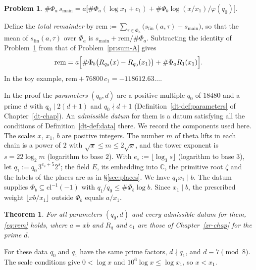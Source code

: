 \documentclass[reqno]{amsart}
\newcounter{chap}
\theoremstyle{definition}
\newtheorem{problem}{Problem}[section]
\theoremstyle{plain}
\newtheorem{theorem}{Theorem}[section]
\newcommand{\C}{\mathbb{C}}
\newcommand{\rem}{\mathrm{rem}}
\newcommand{\smain}{s_{\mathrm{main}}}
\begin{document}
\begin{problem}\label{pr:main}
\(\#\Phi_a\, \smain = a \bigl[ \#\Phi_a (\log x_1 + c_1) + \#\Phi_b \log(x/x_1)/\varphi(q_0) \bigr]\).
\end{problem}

Define the \emph{total remainder} by \(\rem := \sum_{\tau \in \Phi_a} \bigl( s_{\mathrm{fin}}(a, \tau) - \smain \bigr)\), so that the mean of \(s_{\mathrm{fin}}(a, \tau)\) over \(\Phi_a\) is \(\smain + \rem/\#\Phi_a\).  Subtracting the identity of Problem~\ref{pr:main} from that of Problem~\ref{pr:sum-A} gives
\begin{equation}\label{eq:rem}
  \rem = a \Bigl[ \#\Phi_b \bigl( R_{q_0}(x) - R_{q_0}(x_1) \bigr) + \#\Phi_a R_1(x_1) \Bigr] .
\end{equation}
In the toy example, \(\rem + 76800\, c_1 = -118612.63\ldots\).

In the proof the \emph{parameters} \((q_0, d)\) are a positive multiple \(q_0\) of \(18480\) and a prime \(d\) with \(q_0 \mid 2(d + 1)\) and \(q_0 \nmid d + 1\) (Definition~\ref{dt-def:parameters} of Chapter~\ref{dt-chap}).  An \emph{admissible datum} for them is a datum satisfying all the conditions of Definition~\ref{dt-def:data} there.  We record the components used here.  The scales \(x\), \(x_1\), \(b\) are positive integers.  The number \(m\) of theta lifts in each chain is a power of \(2\) with \(\sqrt x \le m \le 2\sqrt x\), and the tower exponent is \(s = 22 \log_2 m\) (logarithm to base \(2\)).  With \(e_s := \lfloor \log_3 s \rfloor\) (logarithm to base \(3\)), let \(q_1 := q_0\,3^{e_s+5}2^s\); the field \(E\), its embedding into \(\C\), the primitive root \(\zeta\) and the labels of the places are as in \S\ref{sec:places}.  We have \(q_1 x_1 \mid b\).  The datum supplies \(\Phi_b \subseteq \mathrm{cl}^{-1}(-1)\) with \(q_1/q_0 \le \#\Phi_b \log b\).  Since \(x_1 \mid b\), the prescribed weight \(\lfloor xb/x_1\rfloor\) outside \(\Phi_b\) equals \(a/x_1\).

\begin{theorem}\label{thm:remainder}
For all parameters \((q_0, d)\) and every admissible datum for them, \eqref{eq:rem} holds, where \(a = xb\) and \(R_q\) and \(c_1\) are those of Chapter~\ref{zr-chap} for the prime \(d\).
\end{theorem}

For these data \(q_0\) and \(q_1\) have the same prime factors, \(d \nmid q_1\), and \(d \equiv 7 \pmod 8\).  The scale conditions give \(0 < \log x\) and \(10^6 \log x \le \log x_1\), so \(x < x_1\).
\end{document}
